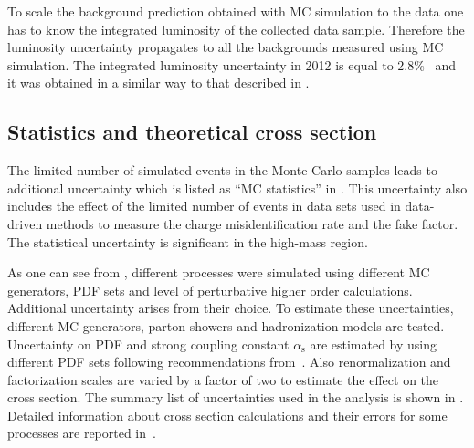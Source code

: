 To scale the background prediction obtained with MC simulation to the data 
one has to know the integrated luminosity of the collected data sample. 
Therefore the luminosity uncertainty propagates to all the backgrounds measured using MC simulation.
The integrated luminosity uncertainty in 2012 is equal to 2.8$\%$~\cite{Aad:2013ucp} 
and it was obtained in a similar way to that described in .

\subsection{Statistics and theoretical cross section}
The limited number of simulated events in the Monte Carlo samples leads to additional uncertainty which is listed as ``MC statistics'' in .
This uncertainty also includes the effect of the limited number of events in data sets used in data-driven methods to measure the charge misidentification rate and the fake factor.
The statistical uncertainty is significant in the high-mass region.

As one can see from , different processes were simulated using different MC generators, PDF sets and level of perturbative higher order calculations.
Additional uncertainty arises from  their choice.
To estimate these uncertainties, different MC generators, parton showers and hadronization models are tested.
Uncertainty on PDF and strong coupling constant $\alpha_{\mathrm{s}}$ are estimated by using different PDF sets following recommendations from~\cite{pdf4lhc}.
Also renormalization and factorization scales are varied by a factor of two to estimate the effect on the cross section.
The summary list of uncertainties used in the analysis is shown in .
Detailed information about cross section calculations and their errors for some processes 
are reported in~\cite{diboson_cross_section,ttW_cross_section,ttV_cross_section}.

